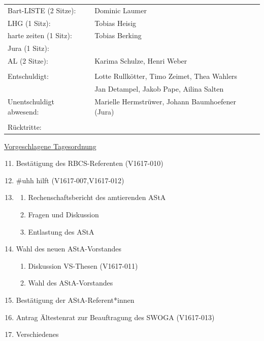\documentclass[ngerman,headheight=70pt]{scrartcl}
\begin{document}
\begin{tabular}{ll}
             Bart-LISTE (2 Sitze): & Dominic Laumer \\
             LHG (1 Sitz): & Tobias Heisig \\
             harte zeiten (1 Sitz): & Tobias Berking \\
             Jura (1 Sitz): &  \\
             AL (2 Sitze): & Karima Schulze, Henri Weber \\
            & \\
        Entschuldigt: & Lotte Rullkötter, Timo Zeimet, Thea Wahlers \\
                      & Jan Detampel, Jakob Pape, Ailina Salten\\
        Unentschuldigt abwesend: &  Marielle Hermstrüwer, Johann Baumhoefener (Jura)\\
                                &\\
        Rücktritte: & \\
    \end{tabular}
    \newpage
    \underline{Vorgeschlagene Tagesordnung}
    \begin{enumerate}[label={\textbf{Top \theenumi}},leftmargin=*]
        \setcounter{enumi}{10}
        \item Bestätigung des RBCS-Referenten (V1617-010)
        \item \#uhh hilft (V1617-007,V1617-012)
        \item
            \begin{enumerate}
                \item Rechenschaftsbericht des amtierenden AStA
                \item Fragen und Diskussion
                \item Entlastung des AStA
            \end{enumerate}
        \item Wahl des neuen AStA-Vorstandes
            \begin{enumerate}
                \item Diskussion VS-Thesen (V1617-011)
                \item Wahl des AStA-Vorstandes
            \end{enumerate}
        \item Bestätigung der AStA-Referent*innen
        \item Antrag Ältestenrat zur Beauftragung des SWOGA (V1617-013)
        \item Verschiedenes
    \end{enumerate}
\end{document}
